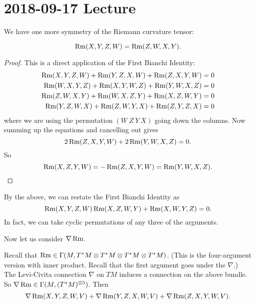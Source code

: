\section{2018-09-17 Lecture}

We have one more symmetry of the Riemann curvature tensor:
\begin{prop}
  \[ \operatorname{Rm}(X,Y,Z,W) = \operatorname{Rm}(Z,W,X,Y). \]
\end{prop}

\begin{proof}
  This is a direct application of the First Bianchi Identity:
  \begin{align*}
    \operatorname{Rm}(X,Y,Z,W) + \operatorname{Rm}(Y,Z,X,W) + \operatorname{Rm}(Z,X,Y,W) &= 0 \\
    \operatorname{Rm}(W,X,Y,Z) + \operatorname{Rm}(X,Y,W,Z) + \operatorname{Rm}(Y,W,X,Z) &= 0 \\
    \operatorname{Rm}(Z,W,X,Y) + \operatorname{Rm}(W,X,Z,Y) + \operatorname{Rm}(X,Z,W,Y) &= 0 \\
    \operatorname{Rm}(Y,Z,W,X) + \operatorname{Rm}(Z,W,Y,X) + \operatorname{Rm}(Z,Y,Z,X) &= 0 
  \end{align*}
  where we are using the permutation $(W \ Z \ Y \ X)$ going down the columns.
  Now summing up the equations and cancelling out gives
  \[ 2\operatorname{Rm}(Z,X,Y,W) + 2\operatorname{Rm}(Y,W,X,Z) = 0. \]
  So
  \[ \operatorname{Rm}(X,Z,Y,W) = -\operatorname{Rm}(Z,X,Y,W) = \operatorname{Rm}(Y,W,X,Z). \qedhere \]
\end{proof}

\begin{rmk}
  By the above, we can restate the First Bianchi Identity as
  \[ \operatorname{Rm}(X,Y,Z,W) \operatorname{Rm}(X,Z,W,Y) + \operatorname{Rm}(X,W,Y,Z) = 0. \]
  In fact, we can take cyclic permutations of any three of the arguments.
\end{rmk}

Now let us consider $\nabla\operatorname{Rm}$.

\begin{prop}
  Recall that $\operatorname{Rm} \in \Gamma(M,T^*M\otimes T^*M\otimes T^*M\otimes T^*M)$.
  (This is the four-argument version with inner product.
  Recall that the first argument goes under the $\nabla$.)
  The Levi-Civita connection $\nabla$ on $TM$ induces a connection on the above bundle.
  So $\nabla\operatorname{Rm} \in \Gamma(M,(T^*M)^{\otimes 5})$.
  Then
  \[ \nabla\operatorname{Rm}(X,Y,Z,W,V) + \nabla\operatorname{Rm}(Y,Z,X,W,V) + \nabla\operatorname{Rm}(Z,X,Y,W,V). \]
\end{prop}

